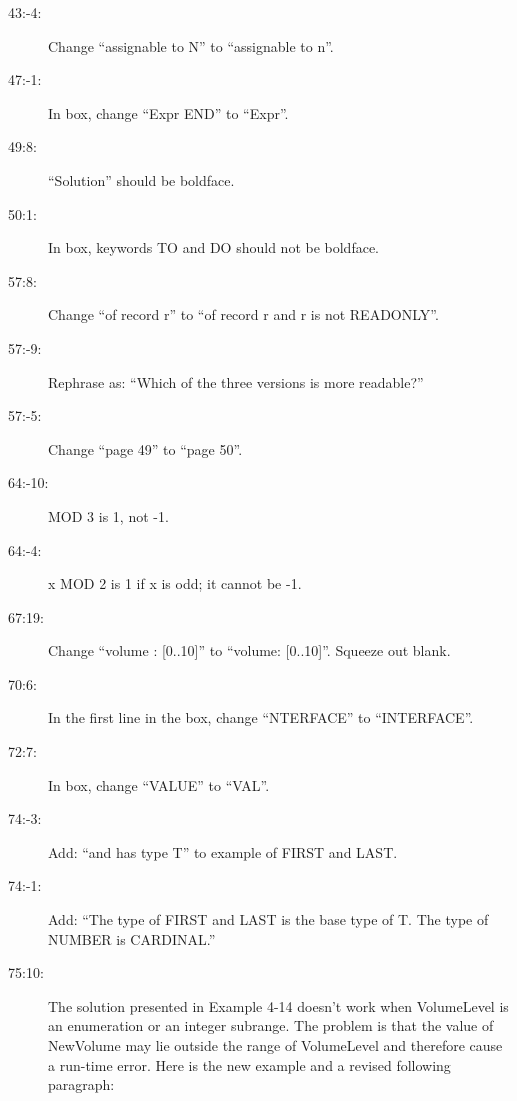 \begin{description}
\item[43:-4:] Change ``{\sf assignable to N}'' to ``{\sf assignable to n}''.

\item[47:-1:] In box, change ``{\sf Expr END}'' to ``{\sf Expr}''.

\item[49:8:] ``Solution'' should be boldface.

\item[50:1:] In box, keywords {\sf TO} and {\sf DO} should not be boldface.

\item[57:8:] Change ``of record {\sf r}'' to ``of record {\sf r}
and {\sf r} is not {\sf READONLY}''.

\item[57:-9:] Rephrase as: ``Which of the three versions is more readable?''

\item[57:-5:] Change ``page 49'' to ``page 50''.

\item[64:-10:]  { MOD 3} is 1, not -1.

\item[64:-4:] {\sf x MOD 2} is 1 if {\sf x} is odd; it cannot be -1.

\item[67:19:] Change ``{\sf volume : [0..10]}'' to ``{\sf volume: [0..10]}''.
Squeeze out blank.

\item[70:6:] In the first line in the box, change ``{\sf NTERFACE}''
to ``{\sf INTERFACE}''.

\item[72:7:] In box, change ``{\sf VALUE}'' to ``{\sf VAL}''.

\item[74:-3:] Add: ``and has type {\sf T}'' to example of {\sf FIRST} and
{\sf LAST}.

\item[74:-1:] Add: ``The type of {\sf FIRST} and {\sf LAST} is the
base type of {\sf T}.  The type of {\sf NUMBER} is {\sf CARDINAL}.''

\item[75:10:] The solution presented in Example 4-14 doesn't 
work when {\sf VolumeLevel} is an enumeration or an integer subrange. 
The problem is that the value of {\sf NewVolume} may lie outside the range 
of {\sf VolumeLevel} and therefore cause a run-time error. Here is the new 
example and a revised following paragraph:


\end{description}
